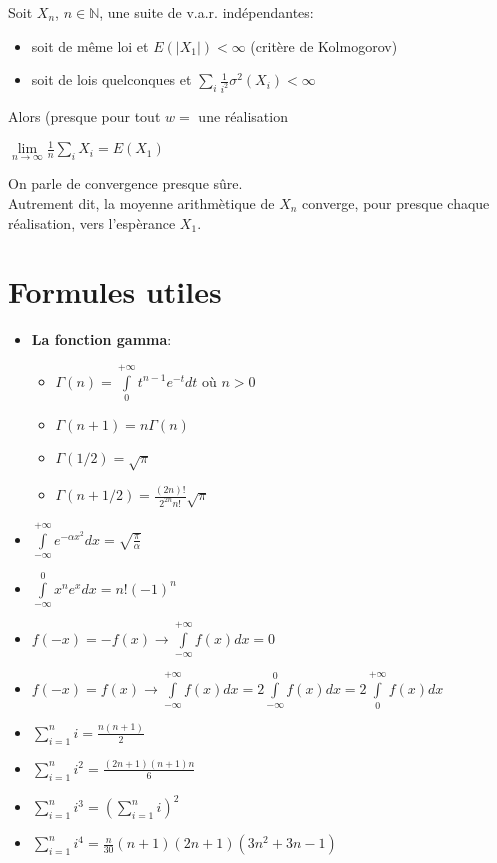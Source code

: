 \documentclass[a4paper,11pt]{report}
\begin{document}
\begin{itemize}
\begin{itemize}
		Soit $X_n$, $n \in \mathbb{N}$, une suite de v.a.r. indépendantes:
		\begin{itemize}
			\item soit de même loi et $E(|X_1|) < \infty$ (critère de Kolmogorov)
			\item soit de lois quelconques et $\sum\limits_{i}{}\frac{1}{i^2}\sigma^2(X_i) < \infty$
		\end{itemize}
		Alors (presque pour tout $w =$ une réalisation\\
		\begin{center}
		$\lim\limits_{n \rightarrow \infty}\frac{1}{n}\sum\limits_{i}{X_i} = E(X_1)$
		\end{center}
	\end{itemize}
	On parle de convergence presque sûre.\\
	Autrement dit, la moyenne arithmètique de $X_n$ converge, pour presque chaque réalisation, vers l'espèrance $X_1$.
\end{itemize}

\section{Formules utiles}
\begin{itemize}
\item \textbf{La fonction gamma}:
	\begin{itemize}
		\item $\Gamma(n)=\int\limits_{0}^{+\infty}{t^{n-1}e^{-t}dt}$ où $n > 0$
		\item $\Gamma(n+1)=n\Gamma(n)$
		\item $\Gamma(1/2)=\sqrt{\pi}$
		\item $\Gamma(n+1/2)=\frac{(2n)!}{2^{2n}n!}\sqrt{\pi}$
	\end{itemize}
\item $\int\limits_{-\infty}^{+\infty}{e^{-\alpha x^2}dx}=\sqrt{\frac{\pi}{\alpha}}$
\item $\int\limits_{-\infty}^{0}{x^ne^xdx}=n!(-1)^n$
\item $f(-x) = -f(x) \rightarrow \int\limits_{-\infty}^{+\infty}{f(x)dx}=0$
\item $f(-x) = f(x) \rightarrow \int\limits_{-\infty}^{+\infty}{f(x)dx} = 2\int\limits_{-\infty}^{0}{f(x)dx} = 2\int\limits_{0}^{+\infty}{f(x)dx}$
\item $\sum\limits_{i=1}^{n}{i} = \frac{n(n+1)}{2}$
\item $\sum\limits_{i=1}^{n}{i^2} = \frac{(2n+1)(n+1)n}{6}$
\item $\sum\limits_{i=1}^{n}{i^3} = (\sum\limits_{i=1}^{n}{i})^2$
\item $\sum\limits_{i=1}^{n}{i^4} = \frac{n}{30}(n+1)(2n+1)(3n^2+3n-1)$
\end{itemize}
\end{document}
